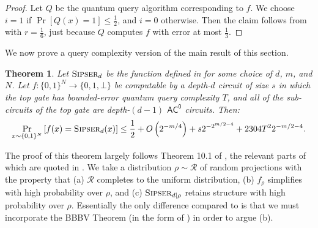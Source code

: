 \documentclass[10pt,a4paper]{article}
\newtheorem{theorem}{Theorem}
\newcommand{\Sipser}{\normalfont\textsc{Sipser}}
\begin{document}
\begin{proof}
Let $Q$ be the quantum query algorithm corresponding to $f$. We choose $i = 1$ if $\Pr\left[Q(x) = 1\right] \le \frac{1}{2}$, and $i = 0$ otherwise. Then the claim follows from  with $r = \frac{1}{6}$, just because $Q$ computes $f$ with error at most $\frac{1}{3}$.
\end{proof}

We now prove a query complexity version of the main result of this section.

\begin{theorem}
\label{thm:bqp_sigma_k_query_version}
Let $\Sipser_d$ be the function defined in  for some choice of $d$, $m$, and $N$. Let $f: \{0,1\}^N \to \{0,1,\bot\}$ be computable by a depth-$d$ circuit of size $s$ in which the top gate has bounded-error quantum query complexity $T$, and all of the sub-circuits of the top gate are depth-$(d-1)$ $\mathsf{AC^0}$ circuits. Then:
\[
\Pr_{x \sim \{0,1\}^N}\left[f(x) = \Sipser_d(x)\right] \le \frac{1}{2} + O\left(2^{-m/4}\right) + s2^{-2^{m/2 - 4}} + 2304T^22^{-m/2 -4}.
\]
\end{theorem}

The proof of this theorem largely follows Theorem 10.1 of \cite{HRST17}, the relevant parts of which are quoted in . We take a distribution $\rho \sim \mathcal{R}$ of random projections with the property that (a) $\mathcal{R}$ completes to the uniform distribution, (b) $f_\rho$ simplifies with high probability over $\rho$, and (c) $\Sipser_{d|\rho}$ retains structure with high probability over $\rho$. Essentially the only difference compared to \cite{HRST17} is that we must incorporate the BBBV Theorem (in the form of ) in order to argue (b).
\end{document}
